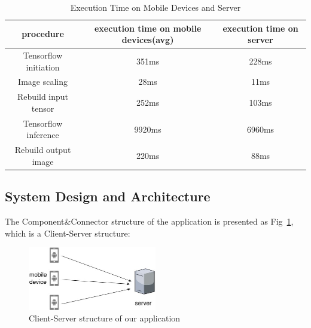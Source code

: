 \documentclass[a4paper,11pt,onecolumn,twoside]{article}
\begin{document}
\begin{CJK*}{GBK}{song}
\begin{table}[H]
  \centering
  \caption{Execution Time on Mobile Devices and Server}\label{tb:1}
  \begin{tabular}{ccc}
    \hline
    procedure & execution time on mobile devices(avg) & execution time on server\\
    \hline
    Tensorflow initiation & 351ms & 228ms\\
    
    Image scaling & 28ms & 11ms\\
    
    Rebuild input tensor & 252ms & 103ms\\
    
    Tensorflow inference & 9920ms & 6960ms\\
    
    Rebuild output image & 220ms & 88ms\\
    \hline
  \end{tabular}
\end{table}



\subsection{System Design and Architecture}


The Component\&Connector structure of the application 
is presented as Fig~\ref{C&C}, which is a Client-Server structure:

\begin{figure}[!htb] %
  \centering %
  \includegraphics[width=0.5\textwidth]{C&C} %
  \caption{Client-Server structure of our application} %
  \label{C&C} %
\end{figure}




\end{CJK*}
\end{document}

